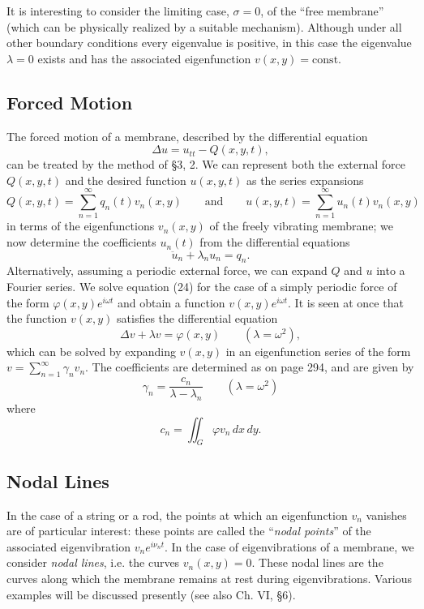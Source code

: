 It is interesting to consider the limiting case, $\sigma=0$, of the ``free membrane'' (which can be physically realized by a suitable mechanism). Although under all other boundary conditions every eigenvalue is positive, in this case the eigenvalue $\lambda=0$ exists and has the associated eigenfunction $v(x,y)=\mathrm{const}.$

\subsection{Forced Motion}
The forced motion of a membrane, described by the differential equation
\begin{equation}\tag{24}
\Delta u=u_{tt}-Q(x,y,t),
\end{equation}
can be treated by the method of \S3, 2. We can represent both the external force $Q(x,y,t)$ and the desired function $u(x,y,t)$ as the series expansions
\[
Q(x,y,t)=\sum_{n=1}^\infty q_n(t)v_n(x,y)
\qquad\text{and}\qquad
u(x,y,t)=\sum_{n=1}^\infty u_n(t)v_n(x,y)
\]
in terms of the eigenfunctions $v_n(x,y)$ of the freely vibrating membrane; we now determine the coefficients $u_n(t)$ from the differential equations
\[
\ddot u_n+\lambda_nu_n=q_n.
\]
Alternatively, assuming a periodic external force, we can expand $Q$ and $u$ into a Fourier series. We solve equation (24) for the case of a simply periodic force of the form $\varphi(x,y)e^{i\omega t}$ and obtain a function $v(x,y)e^{i\omega t}$. It is seen at once that the function $v(x,y)$ satisfies the differential equation
\begin{equation}\tag{25}
\Delta v+\lambda v=\varphi(x,y)\qquad(\lambda=\omega^2),
\end{equation}
which can be solved by expanding $v(x,y)$ in an eigenfunction series of the form $v=\sum_{n=1}^\infty\gamma_nv_n$. The coefficients are determined as on page 294, and are given by
\[
\gamma_n=\frac{c_n}{\lambda-\lambda_n}\qquad(\lambda=\omega^2)
\]
where
\[
c_n=\iint_G\varphi v_n\,dx\,dy.
\]

\subsection{Nodal Lines}
In the case of a string or a rod, the points at which an eigenfunction $v_n$ vanishes are of particular interest: these points are called the ``\emph{nodal points}'' of the associated eigenvibration $v_ne^{i\nu_nt}$. In the case of eigenvibrations of a membrane, we consider \emph{nodal lines}, i.e. the curves $v_n(x,y)=0$. These nodal lines are the curves along which the membrane remains at rest during eigenvibrations. Various examples will be discussed presently (see also Ch. VI, \S6).

